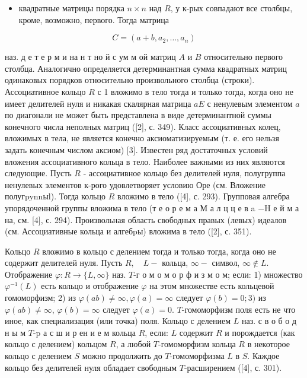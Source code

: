 \documentclass[10pt]{article}
\begin{document}
\begin{itemize}

  \item квадратные матрицы порядка $n \times n$ над $R$, у к-рых совпадают все столбцы, кроме, возможно, первого. Тогда матрица

\end{itemize}



\[

C=\left(a+b, a_{2}, \ldots, a_{n}\right)

\]



наз. д е т е р м и на н т но й с ум м ой матриц $A$ и $B$ относительно первого столбца. Аналогично определяется детерминантная сумма квадратных матриц одинаковых порядков относительно произвольного столбца (строки). Ассоциативное кольцо $R$ с 1 вложимо в тело тогда и только тогда, когда оно не имеет делителей нуля и никакая скалярная матрица $a E$ с ненулевым элементом $a$ по диагонали не может быть представлена в виде детерминантной суммы конечного числа неполных матриц ([2], с. 349). Класс ассоциативных колец, вложимых в тела, не является конечно аксиоматизируемым (т. е. его нельзя задать конечным числом аксиом) [3]. Известен ряд достаточных условий вложения ассоциативного кольца в тело. Наиболее важными из них являются следующие. Пусть $R$ - ассоциативное кольцо без делителей нуля, полугруппа ненулевых элементов к-рого удовлетворяет условию Оре (см. Вложение полугpynnыl). Тогда кольцо $R$ вложимо в тело ([4], с. 293). Групповая алгебра упорядоченной группы вложима в тело (т е о р е м а М а л ц ц е в a $-\mathrm{H}$ е й м а на, см. [4], с. 294). Произвольная область свободных правых (левых) идеалов (см. Ассоциативные кольца и алгебpы) вложима в тело ([2], с. 351).



Кольцо $R$ вложимо в кольцо с делением тогда и только тогда, когда оно не содержит делителей нуля. Пусть $R, \quad L-$ кольца, $\infty-$ символ, $\infty \notin L$. Отображение $\varphi: R \rightarrow\{L, \infty\}$ наз. $T$-г о м о м о р ф и з м о м; если: 1) множество $\varphi^{-1}(L)$ есть кольцо и отображение $\varphi$ на этом множестве есть кольцевой гомоморфизм; 2) из $\varphi(a b) \neq \infty, \varphi(a)=\infty$ следует $\varphi(b)=0 ; 3)$ из $\varphi(a b) \neq \infty$, $\varphi(b)=\infty$ следует $\varphi(a)=0$. $T$-гомоморфизм поля есть не что иное, как специализация (или точка) поля. Кольцо с делением $L$ наз. с в о б о д н ы м $T$-p а с ш и р ен и е м кольца $R$, если: $L$ содержит $R$ и порождается (как кольцо с делением) кольцом $R$, а любой $T$-гомоморфизм кольца $R$ в некоторое кольцо с делением $S$ можно продолжить до $T$-гомоморфизма $L$ в $S$. Каждое кольцо без делителей нуля обладает свободным $T$-расширением ([4], с. 301).
\end{document}
